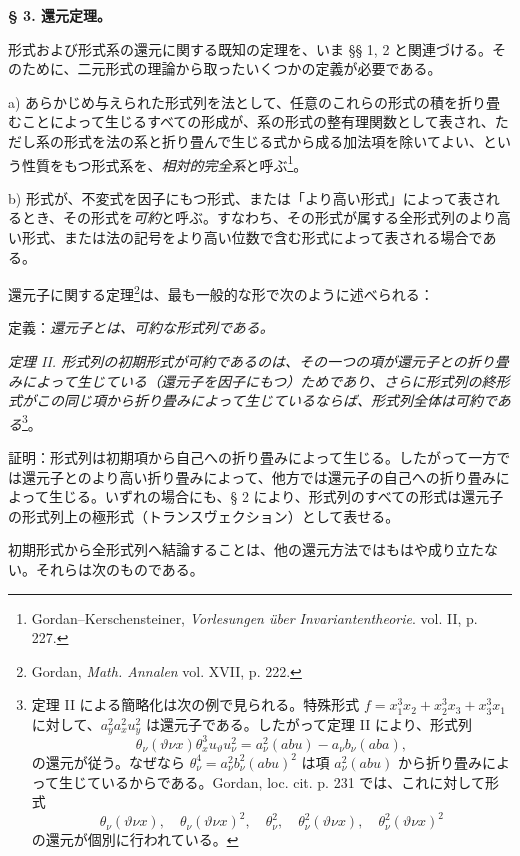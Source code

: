 \documentclass[11pt]{jlreq}
\begin{document}
\begin{center}
\textbf{§ 3. \quad 還元定理。}
\end{center}

形式および形式系の還元に関する既知の定理を、いま §§ 1, 2 と関連づける。そのために、二元形式の理論から取ったいくつかの定義が必要である。

a) あらかじめ与えられた形式列を法として、任意のこれらの形式の積を折り畳むことによって生じるすべての形成が、系の形式の整有理関数として表され、ただし系の形式を法の系と折り畳んで生じる式から成る加法項を除いてよい、という性質をもつ形式系を、\emph{相対的完全系}と呼ぶ\footnote{Gordan--Kerschensteiner, \emph{Vorlesungen über Invariantentheorie}. vol. II, p. 227.}。

b) 形式が、不変式を因子にもつ形式、または「より高い形式」によって表されるとき、その形式を\emph{可約}と呼ぶ。すなわち、その形式が属する全形式列のより高い形式、または法の記号をより高い位数で含む形式によって表される場合である。

還元子に関する定理\footnote{Gordan, \emph{Math. Annalen} vol. XVII, p. 222.}は、最も一般的な形で次のように述べられる：

定義：\emph{還元子とは、可約な形式列である。}

\emph{定理 II. 形式列の初期形式が可約であるのは、その一つの項が還元子との折り畳みによって生じている（還元子を因子にもつ）ためであり、さらに形式列の終形式がこの同じ項から折り畳みによって生じているならば、形式列全体は可約である}\footnote{定理 II による簡略化は次の例で見られる。特殊形式 $f=x_1^3x_2+x_2^3x_3+x_3^3x_1$ に対して、$a_y^2a_x^2u_y^2$ は還元子である。したがって定理 II により、形式列
\[
\theta_\nu(\vartheta\nu x)\theta_x^3u_\vartheta u_\nu^2
=
a_\nu^2(abu)-a_\nu b_\nu(aba),
\]
の還元が従う。なぜなら $\theta_\nu^4=a_\nu^2b_\nu^2(abu)^2$ は項 $a_\nu^2(abu)$ から折り畳みによって生じているからである。Gordan, loc. cit. p. 231 では、これに対して形式
\[
\theta_\nu(\vartheta\nu x),\quad \theta_\nu(\vartheta\nu x)^2,\quad
\theta_\nu^2,\quad \theta_\nu^2(\vartheta\nu x),\quad
\theta_\nu^2(\vartheta\nu x)^2
\]
の還元が個別に行われている。}。

証明：形式列は初期項から自己への折り畳みによって生じる。したがって一方では還元子とのより高い折り畳みによって、他方では還元子の自己への折り畳みによって生じる。いずれの場合にも、§ 2 により、形式列のすべての形式は還元子の形式列上の極形式（トランスヴェクション）として表せる。

初期形式から全形式列へ結論することは、他の還元方法ではもはや成り立たない。それらは次のものである。
\end{document}
